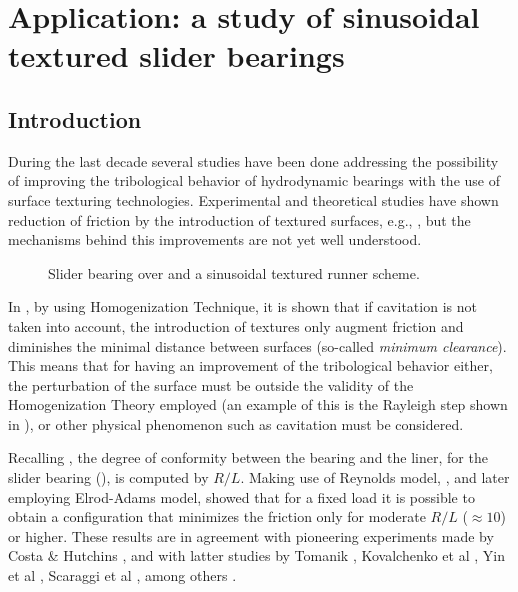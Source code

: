 \chapter{Application: a study of sinusoidal textured slider bearings}
\label{chap:slider_bearing}

\section{Introduction}

During the last decade several studies have been done addressing the possibility of improving the tribological behavior of hydrodynamic bearings with the use of surface texturing technologies. Experimental and theoretical studies have shown reduction of friction by the introduction of textured surfaces, e.g., \cite{dobrica2010,gadeshi2012,etsion2013,
checo2014a}, but the mechanisms behind this improvements are not yet well understood.
\begin{figure}[h!]
 \centering 
 \def\svgwidth{\textwidth}	
 \footnotesize{
}
\caption{Slider bearing over and a sinusoidal textured runner scheme.}\label{fig:slider_bearing}
\end{figure}

In \cite{buscaglia05c}, by using Homogenization Technique, it is shown that if cavitation is not taken into account, the introduction of textures only augment friction and diminishes the minimal distance between surfaces (so-called \emph{minimum clearance}). This means that for having an improvement of the tribological behavior either, the perturbation of the surface must be outside the validity of the Homogenization Theory employed (an example of this is the Rayleigh step shown in ), or other physical phenomenon such as cavitation must be considered.

Recalling , the degree of conformity between the bearing and the liner, for the slider bearing (), is computed by $R/L$. Making use of Reynolds model, \citeauthor{gadeshi2012} \cite{gadeshi2012}, and later \citeauthor{checo2014a} \cite{checo2014a} employing Elrod-Adams model, showed that for a fixed load it is possible to obtain a configuration that minimizes the friction only for moderate $R/L$ ($\approx 10$) or higher. These results
are in agreement with pioneering experiments made by Costa \& Hutchins \cite{costa2007}, and with latter studies by Tomanik \cite{tomanik2008,tomanik2013}, 
 Kovalchenko et al \cite{koval2011},
Yin et al \cite{yin2012}, Scaraggi et al 
\cite{scaraggi2013}, among others \cite{dobrica2010,ali2012,grabon2013}. 

